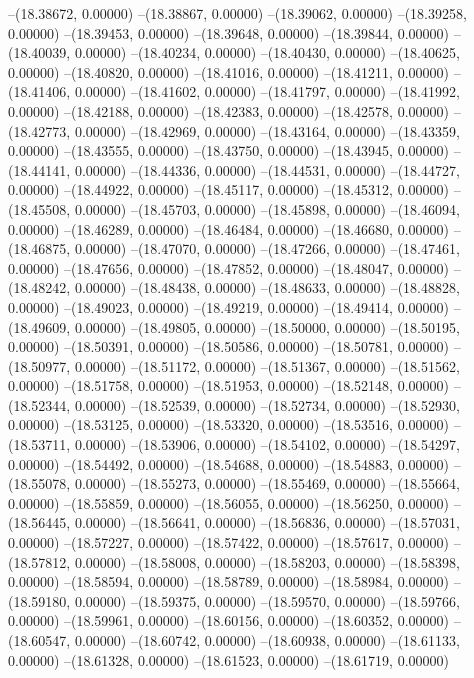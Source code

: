 --(18.38672, 0.00000)
--(18.38867, 0.00000)
--(18.39062, 0.00000)
--(18.39258, 0.00000)
--(18.39453, 0.00000)
--(18.39648, 0.00000)
--(18.39844, 0.00000)
--(18.40039, 0.00000)
--(18.40234, 0.00000)
--(18.40430, 0.00000)
--(18.40625, 0.00000)
--(18.40820, 0.00000)
--(18.41016, 0.00000)
--(18.41211, 0.00000)
--(18.41406, 0.00000)
--(18.41602, 0.00000)
--(18.41797, 0.00000)
--(18.41992, 0.00000)
--(18.42188, 0.00000)
--(18.42383, 0.00000)
--(18.42578, 0.00000)
--(18.42773, 0.00000)
--(18.42969, 0.00000)
--(18.43164, 0.00000)
--(18.43359, 0.00000)
--(18.43555, 0.00000)
--(18.43750, 0.00000)
--(18.43945, 0.00000)
--(18.44141, 0.00000)
--(18.44336, 0.00000)
--(18.44531, 0.00000)
--(18.44727, 0.00000)
--(18.44922, 0.00000)
--(18.45117, 0.00000)
--(18.45312, 0.00000)
--(18.45508, 0.00000)
--(18.45703, 0.00000)
--(18.45898, 0.00000)
--(18.46094, 0.00000)
--(18.46289, 0.00000)
--(18.46484, 0.00000)
--(18.46680, 0.00000)
--(18.46875, 0.00000)
--(18.47070, 0.00000)
--(18.47266, 0.00000)
--(18.47461, 0.00000)
--(18.47656, 0.00000)
--(18.47852, 0.00000)
--(18.48047, 0.00000)
--(18.48242, 0.00000)
--(18.48438, 0.00000)
--(18.48633, 0.00000)
--(18.48828, 0.00000)
--(18.49023, 0.00000)
--(18.49219, 0.00000)
--(18.49414, 0.00000)
--(18.49609, 0.00000)
--(18.49805, 0.00000)
--(18.50000, 0.00000)
--(18.50195, 0.00000)
--(18.50391, 0.00000)
--(18.50586, 0.00000)
--(18.50781, 0.00000)
--(18.50977, 0.00000)
--(18.51172, 0.00000)
--(18.51367, 0.00000)
--(18.51562, 0.00000)
--(18.51758, 0.00000)
--(18.51953, 0.00000)
--(18.52148, 0.00000)
--(18.52344, 0.00000)
--(18.52539, 0.00000)
--(18.52734, 0.00000)
--(18.52930, 0.00000)
--(18.53125, 0.00000)
--(18.53320, 0.00000)
--(18.53516, 0.00000)
--(18.53711, 0.00000)
--(18.53906, 0.00000)
--(18.54102, 0.00000)
--(18.54297, 0.00000)
--(18.54492, 0.00000)
--(18.54688, 0.00000)
--(18.54883, 0.00000)
--(18.55078, 0.00000)
--(18.55273, 0.00000)
--(18.55469, 0.00000)
--(18.55664, 0.00000)
--(18.55859, 0.00000)
--(18.56055, 0.00000)
--(18.56250, 0.00000)
--(18.56445, 0.00000)
--(18.56641, 0.00000)
--(18.56836, 0.00000)
--(18.57031, 0.00000)
--(18.57227, 0.00000)
--(18.57422, 0.00000)
--(18.57617, 0.00000)
--(18.57812, 0.00000)
--(18.58008, 0.00000)
--(18.58203, 0.00000)
--(18.58398, 0.00000)
--(18.58594, 0.00000)
--(18.58789, 0.00000)
--(18.58984, 0.00000)
--(18.59180, 0.00000)
--(18.59375, 0.00000)
--(18.59570, 0.00000)
--(18.59766, 0.00000)
--(18.59961, 0.00000)
--(18.60156, 0.00000)
--(18.60352, 0.00000)
--(18.60547, 0.00000)
--(18.60742, 0.00000)
--(18.60938, 0.00000)
--(18.61133, 0.00000)
--(18.61328, 0.00000)
--(18.61523, 0.00000)
--(18.61719, 0.00000)
